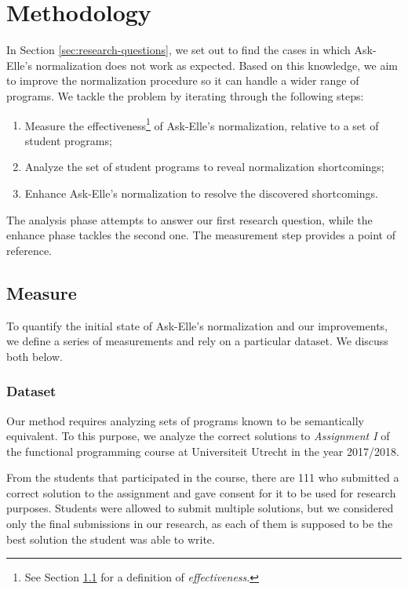 \chapter{Methodology}

In Section \ref{sec:research-questions}, we set out to find the cases in which Ask-Elle's normalization does not work as expected. Based on this knowledge, we aim to improve the normalization procedure so it can handle a wider range of programs. We tackle the problem by iterating through the following steps:

\begin{enumerate}
    \item Measure the effectiveness\footnote{See Section \ref{sec:method-measure} for a definition of \emph{effectiveness}.} of Ask-Elle's normalization, relative to a set of student programs;
    \item Analyze the set of student programs to reveal normalization shortcomings;
    \item Enhance Ask-Elle's normalization to resolve the discovered shortcomings.
\end{enumerate}

The analysis phase attempts to answer our first research question, while the enhance phase tackles the second one. The measurement step provides a point of reference.

\section{Measure}
\label{sec:method-measure}

To quantify the initial state of Ask-Elle's normalization and our improvements, we define a series of measurements and rely on a particular dataset. We discuss both below.

\subsection{Dataset}

Our method requires analyzing sets of programs known to be semantically equivalent. To this purpose, we analyze the correct solutions to \emph{Assignment I} of the functional programming course at Universiteit Utrecht in the year 2017/2018.

From the students that participated in the course, there are 111 who submitted a correct solution to the assignment and gave consent for it to be used for research purposes. Students were allowed to submit multiple solutions, but we considered only the final submissions in our research, as each of them is supposed to be the best solution the student was able to write.


